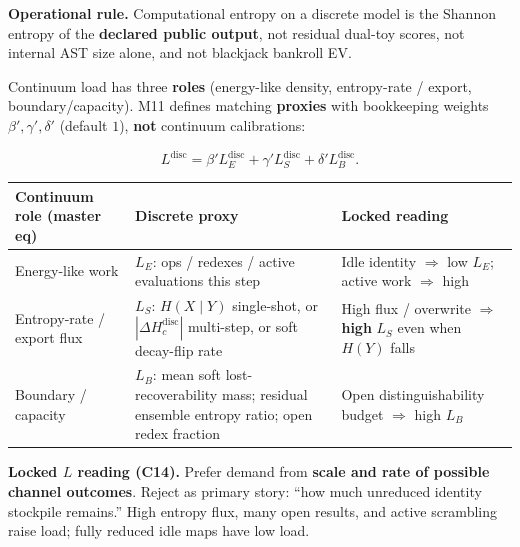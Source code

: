 \documentclass[
  11pt,
]{article}
\newcounter{none} %
\begin{document}
\textbf{Operational rule.} Computational entropy on a discrete model is
the Shannon entropy of the \textbf{declared public output}, not residual
dual-toy scores, not internal AST size alone, and not blackjack bankroll
EV.

Continuum load has three \textbf{roles} (energy-like density,
entropy-rate / export, boundary/capacity). M11 defines matching
\textbf{proxies} with bookkeeping weights \(\beta',\gamma',\delta'\)
(default \(1\)), \textbf{not} continuum calibrations:

\[
L^{\mathrm{disc}}
=
\beta' L_E^{\mathrm{disc}}
+
\gamma' L_S^{\mathrm{disc}}
+
\delta' L_B^{\mathrm{disc}}.
\]

{\def\LTcaptype{none} %
\begin{longtable}[]{@{}
  >{\raggedright\arraybackslash}p{}
  >{\raggedright\arraybackslash}p{}
  >{\raggedright\arraybackslash}p{}@{}}
\toprule\noalign{}
\begin{minipage}[b]{\linewidth}\raggedright
Continuum role (master eq)
\end{minipage} & \begin{minipage}[b]{\linewidth}\raggedright
Discrete proxy
\end{minipage} & \begin{minipage}[b]{\linewidth}\raggedright
Locked reading
\end{minipage} \\
\midrule\noalign{}
\endhead
\bottomrule\noalign{}
\endlastfoot
Energy-like work & \(L_E\): ops / redexes / active evaluations this step
& Idle identity \(\Rightarrow\) low \(L_E\); active work \(\Rightarrow\)
high \\
Entropy-rate / export flux & \(L_S\): \(H(X\mid Y)\) single-shot, or
\(|\Delta H_c^{\mathrm{disc}}|\) multi-step, or soft decay-flip rate &
High flux / overwrite \(\Rightarrow\) \textbf{high} \(L_S\) even when
\(H(Y)\) falls \\
Boundary / capacity & \(L_B\): mean soft lost-recoverability mass;
residual ensemble entropy ratio; open redex fraction & Open
distinguishability budget \(\Rightarrow\) high \(L_B\) \\
\end{longtable}
}

\textbf{Locked \(L\) reading (C14).} Prefer demand from \textbf{scale
and rate of possible channel outcomes}. Reject as primary story: ``how
much unreduced identity stockpile remains.'' High entropy flux, many
open results, and active scrambling raise load; fully reduced idle maps
have low load.
\end{document}
